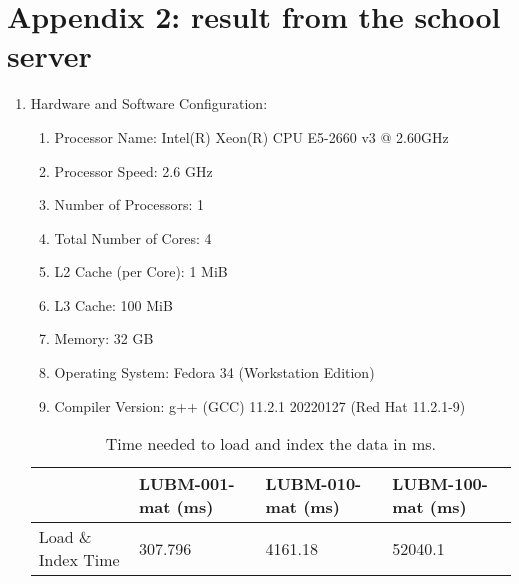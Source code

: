 \documentclass{article}
\begin{document}
\section*{Appendix 2: result from the school server}
\begin{enumerate}
	\item Hardware and Software Configuration:

\begin{enumerate}

\item Processor Name:	 Intel(R) Xeon(R) CPU E5-2660 v3 @ 2.60GHz

\item Processor Speed:	2.6 GHz

\item Number of Processors:	1

\item Total Number of Cores:	4

\item L2 Cache (per Core):	1 MiB

\item L3 Cache:	100 MiB

\item Memory:	32	 GB

\item Operating System: Fedora 34 (Workstation Edition)

\item Compiler Version: g++ (GCC) 11.2.1 20220127 (Red Hat 11.2.1-9)

\end{enumerate}

\begin{table}[H]\centering
\begin{tabular}{|l|l|l|l|}
\hline
                   & LUBM-001-mat (ms) & LUBM-010-mat (ms) & LUBM-100-mat (ms)\\ \hline
Load \& Index Time & 307.796         & 4161.18        & 52040.1        \\ \hline
\end{tabular}
\caption{Time needed to load and index the data in ms.}
\end{table}



\end{enumerate}
\end{document}
